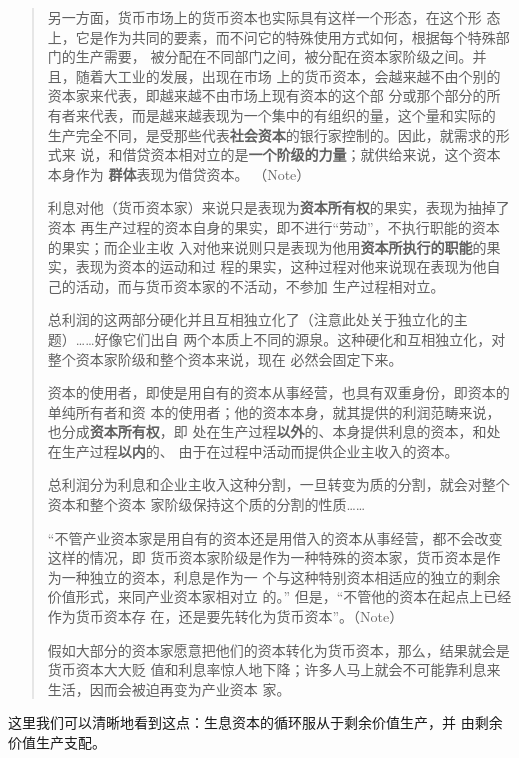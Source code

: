 \begin{quotation}另一方面，货币市场上的货币资本也实际具有这样一个形态，在这个形
态上，它是作为共同的要素，而不问它的特殊使用方式如何，根据每个特殊部门的生产需要，
被分配在不同部门之间，被分配在资本家阶级之间。并且，随着大工业的发展，出现在市场
上的货币资本，会越来越不由个别的资本家来代表，即越来越不由市场上现有资本的这个部
分或那个部分的所有者来代表，而是越来越表现为一个集中的有组织的量，这个量和实际的
生产完全不同，是受那些代表\textbf{社会资本}的银行家控制的。因此，就需求的形式来
说，和借贷资本相对立的是\textbf{一个阶级的力量}；就供给来说，这个资本本身作为
\textbf{群体}表现为借贷资本。 （Note）

利息对他（货币资本家）来说只是表现为\textbf{资本所有权}的果实，表现为抽掉了资本
再生产过程的资本自身的果实，即不进行“劳动”，不执行职能的资本的果实；而企业主收
入对他来说则只是表现为他用\textbf{资本所执行的职能}的果实，表现为资本的运动和过
程的果实，这种过程对他来说现在表现为他自己的活动，而与货币资本家的不活动，不参加
生产过程相对立。

总利润的这两部分硬化并且互相独立化了（注意此处关于独立化的主题）……好像它们出自
两个本质上不同的源泉。这种硬化和互相独立化，对整个资本家阶级和整个资本来说，现在
必然会固定下来。

资本的使用者，即使是用自有的资本从事经营，也具有双重身份，即资本的单纯所有者和资
本的使用者；他的资本本身，就其提供的利润范畴来说，也分成\textbf{资本所有权}，即
处在生产过程\textbf{以外}的、本身提供利息的资本，和处在生产过程\textbf{以内}的、
由于在过程中活动而提供企业主收入的资本。

总利润分为利息和企业主收入这种分割，一旦转变为质的分割，就会对整个资本和整个资本
家阶级保持这个质的分割的性质……

“不管产业资本家是用自有的资本还是用借入的资本从事经营，都不会改变这样的情况，即
货币资本家阶级是作为一种特殊的资本家，货币资本是作为一种独立的资本，利息是作为一
个与这种特别资本相适应的独立的剩余价值形式，来同产业资本家相对立
的。” 但是，“不管他的资本在起点上已经作为货币资本存
在，还是要先转化为货币资本”。（Note）

假如大部分的资本家愿意把他们的资本转化为货币资本，那么，结果就会是货币资本大大贬
值和利息率惊人地下降；许多人马上就会不可能靠利息来生活，因而会被迫再变为产业资本
家。

\end{quotation}这里我们可以清晰地看到这点：生息资本的循环服从于剩余价值生产，并
由剩余价值生产支配。

